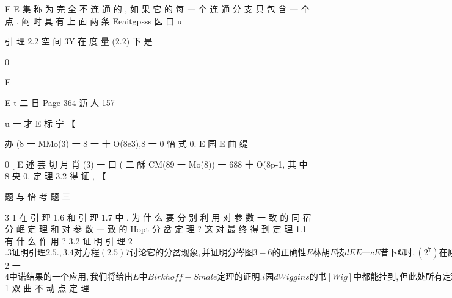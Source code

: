 {{{{{{{{{{{{{{{{{{E
E 集 称 为 完 全 不 连
通 的 , 如 果 它 的 每 一 个 连 通 分 支 只 包 含 一 个 点 . 闷 时 具 有 上 面 两 条
Eeaitgpsss 医 口 u

引 理 2.2 空 间 3Y 在 度 量 (2.2) 下 是

0

E

E t 二 日
Page-364
沥 人 157

u 一 才
E 标
宁 【

办 (8 一 MMo(3) 一 8 一 十 O(8e3),8 一 0 怡 式 0.
E 园
E
曲 缇

0
[
E 述 芸 切 月
肖 (3) 一 口 ( 二 酥 CM(89 一 Mo(8)) 一 688 十 O(8p-1,
其 中 8 央 0. 定 理 3.2 得 证 , 【

题 与 怡 考 题 三

3 1 在 引 理 1.6 和 引 理 1.7 中 , 为 什 么 要 分 别 利 用 对 参 数 一 致 的 同 宿 分
岷 定 理 和 对 参 数 一 致 的 Hopt 分 岔 定 理 ? 这 对 最 终 得 到 定 理 1.1 有 什 么 作 用 ?
3.2 证 明 引 理 2
$.3 证 明 引 理 2.5. ,
3.4 对 方 程 (2.5)7 讨 论 它 的 分 岔 现 象 , 并 证 明 分 岑 图 3-6 的 正 确 性
E 林 胡
E 技 d

E
E 一

c
E 昔卜《l时,(2^7)在原点的发散量为 弼 奂 0.)
Page-365
E 招

河 八
s, 使 得 对 其 巾 任 意 序 列 口 一 (aijiez, 古 一 仁 jez, 有 a 二 页 . 下
EoE l 志
医 沥 朱达 朐 许 4
E 0 沥 团 E 沥
u i 志 江 东 5 国 衍
6
浩
E
U 扬 一 才 扬
[ 史
bn d 吴 河
心 巳 经 取 定 , 取 aL1EKu 使 得 心 1 世 i 一 0,1,

2

1 一
E

E 水
人
[

[ 不

一
c 东 |

E
E 沥
2
Page-366
医 沥 l 李

2
五 章 中 是 我 们 研 究 空 间 R 中 歌 点 同 宿 分 岔 的 基 础 , 同 E
也 有 其 自 身 的 重 要 价 值 . 在 8 1 中 我 们 证 明 一 个 双 曲 不 动 点 定 理 .
在 2 中 引 进 符 号 助 力 学 的 基 本 概 念 . 在 8 3 中 给 出 马 蹄 存 在 定 理
E
引 理 . 在 8 5 中 作 为 $ 2 一 $ 4 中 诺 结 果 的 一 个 应 用 , 我 们 将 给 出 E
中 Birkhoff-Smale 定 理 的 证 明 .

i 园 d
Wiggins 的 书 [Wig] 中 都 能 挂 到 , 但 此 处 所 有 定 理 的 证 明 郭 是 独 立
给 出 的 . 我 们 力 图 把 儿 何 直 观 与 数 学 的 严 密 性 统 一 起 来 , 并 给 予
读 者 一 套 易 于 掌 握 的 方 法 , 用 以 解 决 高 维 空 间 中 其 它 类 似 的 闰 题 .

$ 1 双 曲 不 动 点 定 理

}}}}}}}}}}}}}}}}}}
